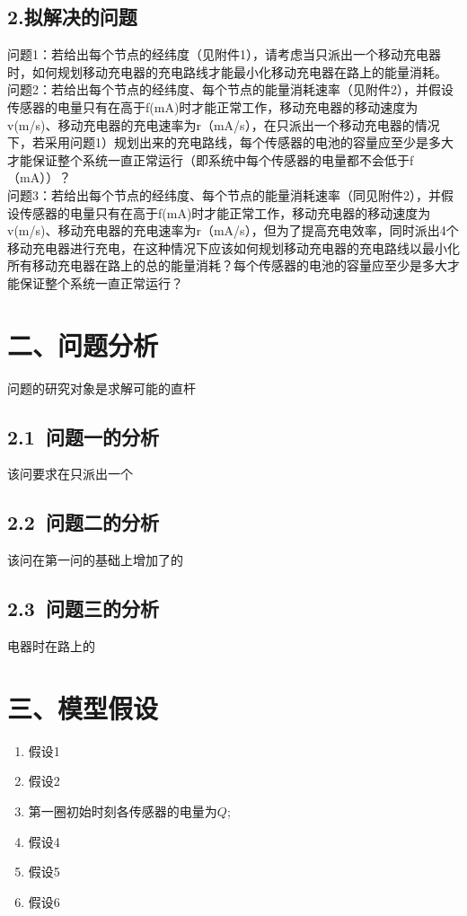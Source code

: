 \documentclass[12pt,a4paper]{article}
\begin{document}
\subsection*{2.拟解决的问题}
\noindent 问题1：若给出每个节点的经纬度（见附件1），请考虑当只派出一个移动充电器时，如何规划移动充电器的充电路线才能最小化移动充电器在路上的能量消耗。 \vspace{+0.3em}\\%
问题2：若给出每个节点的经纬度、每个节点的能量消耗速率（见附件2），并假设传感器的电量只有在高于f(mA)时才能正常工作，移动充电器的移动速度为v(m/s)、移动充电器的充电速率为r（mA/s），在只派出一个移动充电器的情况下，若采用问题1）规划出来的充电路线，每个传感器的电池的容量应至少是多大才能保证整个系统一直正常运行（即系统中每个传感器的电量都不会低于f（mA））？ \vspace{+0.3em}\\%
问题3：若给出每个节点的经纬度、每个节点的能量消耗速率（同见附件2），并假设传感器的电量只有在高于f(mA)时才能正常工作，移动充电器的移动速度为v(m/s)、移动充电器的充电速率为r（mA/s），但为了提高充电效率，同时派出4个移动充电器进行充电，在这种情况下应该如何规划移动充电器的充电路线以最小化所有移动充电器在路上的总的能量消耗？每个传感器的电池的容量应至少是多大才能保证整个系统一直正常运行？
\section*{二、问题分析}
问题的研究对象是求解可能的直杆
\subsection*{2.1\ 问题一的分析}
该问要求在只派出一个
\vspace{-1.0em}
\subsection*{2.2\ 问题二的分析}
该问在第一问的基础上增加了的
\vspace{-1.0em}
\subsection*{2.3\ 问题三的分析}
电器时在路上的
\vspace{-0.5em}
\section*{三、模型假设}
\begin{spacing}{1.0}
	\begin{enumerate}
		\item[1)] 假设1
		\item[2)] 假设2
		\item[3)] 第一圈初始时刻各传感器的电量为$Q$;
		\item[4)] 假设4
		\item[5)] 假设5
		\item[6)] 假设6
	\end{enumerate}
\end{spacing}
\vspace{-0.5em}
\end{document}
